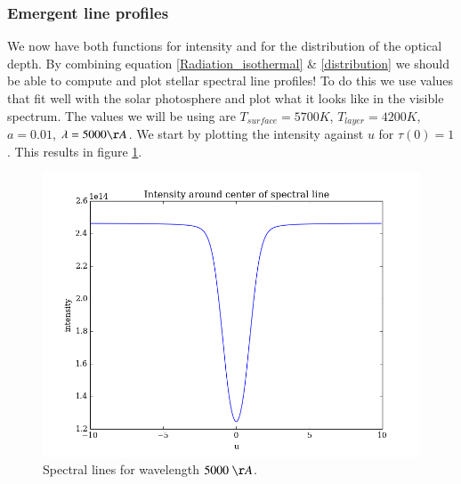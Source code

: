 \documentclass{aa}   %
\begin{document}
\subsubsection{Emergent line profiles}
We now have both functions for intensity and for the distribution of the optical depth. By combining equation \ref{Radiation_isothermal} \& \ref{distribution} we should be able to compute and plot stellar spectral line profiles!
To do this we use values that fit well with the solar photosphere and plot what it looks like in the visible spectrum.
The values we will be using are $T_{surface} = 5700 K$, $T_{layer} = 4200 K$, $a = 0.01$, $\lambda = 5000 \AA$.
We start by plotting the intensity against $u$ for $\tau(0) = 1$. This results in figure \ref{emergent_line_orig_5000}.
\begin{figure}
 \includegraphics[width=.49\textwidth]{emergent_line_orig_5000.png}
 \caption{Spectral lines for wavelength $5000 ~\AA$.}
 \label{emergent_line_orig_5000}
\end{figure}
\end{document}
